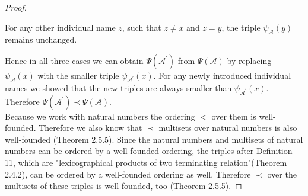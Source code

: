 \documentclass{book}
\theoremstyle{break}
\theoremstyle{definition}
\begin{document}
\begin{proof}
\begin{itemize}
For any other individual name $z$, such that $z\neq x$ and $z=y$, the triple $\psi_\mathcal{A}(y)$ remains unchanged.
\end{itemize}
Hence in all three cases we can obtain $\Psi(\mathcal{A}^\prime)$ from $\Psi(\mathcal{A})$ by replacing $\psi_\mathcal{A}(x)$ with the smaller triple $\psi_{\mathcal{A}^\prime}(x)$. For any newly introduced individual names we showed that the new triples are always smaller than $\psi_{\mathcal{A}^\prime}(x)$. Therefore $\Psi(\mathcal{A}^\prime)\prec\Psi(\mathcal{A})$.\\
Because we work with natural numbers the ordering $<$ over them is well-founded. Therefore we also know that $\prec$ multisets over natural numbers is also well-founded \cite{bn}(Theorem 2.5.5). Since the natural numbers and multisets of natural numbers can be ordered by a well-founded ordering, the triples after Definition 11, which are "lexicographical products of two terminating relation"\cite{bn}(Theorem 2.4.2), can be ordered by a well-founded ordering as well. Therefore $\prec$ over the multisets of these triples is well-founded, too \cite{bn}(Theorem 2.5.5).  
\end{proof}
\end{document}
